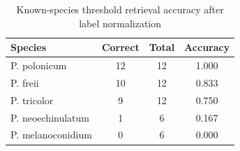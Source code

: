 \begin{table}[ht]
\centering
\caption{Known-species threshold retrieval accuracy after label normalization}
\label{tab:threshold_known_species}
\begin{tabular}{@{}lccc@{}}
\toprule
Species & Correct & Total & Accuracy \\
\midrule
P. polonicum & 12 & 12 & 1.000 \\
P. freii & 10 & 12 & 0.833 \\
P. tricolor & 9 & 12 & 0.750 \\
P. neoechinulatum & 1 & 6 & 0.167 \\
P. melanoconidium & 0 & 6 & 0.000 \\
\bottomrule
\end{tabular}
\end{table}
